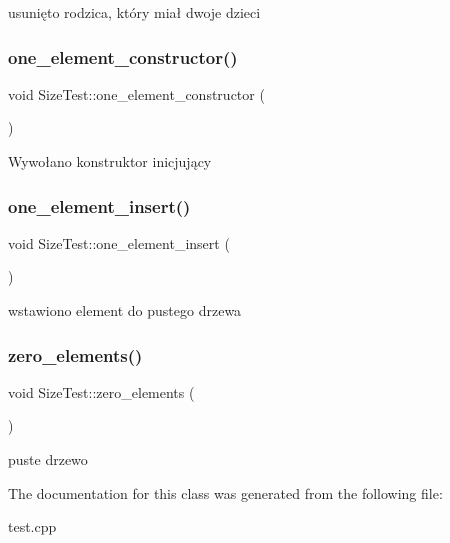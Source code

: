 usunięto rodzica, który miał dwoje dzieci \mbox{\label{class_size_test_a85261b7c20794c5d64335ca31cdf37cf}} 
\subsubsection{\texorpdfstring{one\+\_\+element\+\_\+constructor()}{one\_element\_constructor()}}
{\footnotesize\ttfamily void Size\+Test\+::one\+\_\+element\+\_\+constructor (\begin{DoxyParamCaption}{ }\end{DoxyParamCaption})\hspace{0.3cm}{\ttfamily [inline]}}

Wywołano konstruktor inicjujący \mbox{\label{class_size_test_a0aca43b07dd7f2dc7abb018193c7957a}} 
\subsubsection{\texorpdfstring{one\+\_\+element\+\_\+insert()}{one\_element\_insert()}}
{\footnotesize\ttfamily void Size\+Test\+::one\+\_\+element\+\_\+insert (\begin{DoxyParamCaption}{ }\end{DoxyParamCaption})\hspace{0.3cm}{\ttfamily [inline]}}

wstawiono element do pustego drzewa \mbox{\label{class_size_test_aaed7bed9e378c1d8f57b841b20f25caa}} 
\subsubsection{\texorpdfstring{zero\+\_\+elements()}{zero\_elements()}}
{\footnotesize\ttfamily void Size\+Test\+::zero\+\_\+elements (\begin{DoxyParamCaption}{ }\end{DoxyParamCaption})\hspace{0.3cm}{\ttfamily [inline]}}

puste drzewo 

The documentation for this class was generated from the following file\+:\begin{DoxyCompactItemize}
\item 
test.\+cpp\end{DoxyCompactItemize}
